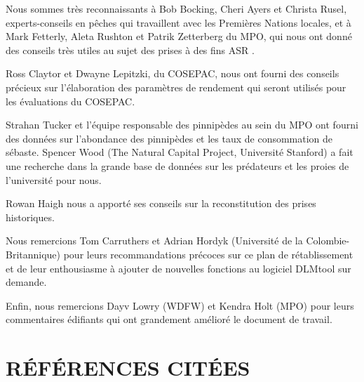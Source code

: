 \documentclass[french,11pt]{book}
\begin{document}
Nous sommes très reconnaissants à Bob Bocking, Cheri Ayers et Christa Rusel, experts-conseils en pêches qui travaillent avec les Premières Nations locales, et à Mark Fetterly, Aleta Rushton et Patrik Zetterberg du MPO, qui nous ont donné des conseils très utiles au sujet des prises à des fins ASR .

Ross Claytor et Dwayne Lepitzki, du COSEPAC, nous ont fourni des conseils précieux sur l'élaboration des paramètres de rendement qui seront utilisés pour les évaluations du COSEPAC.

Strahan Tucker et l'équipe responsable des pinnipèdes au sein du MPO ont fourni des données sur l'abondance des pinnipèdes et les taux de consommation de sébaste. Spencer Wood (The Natural Capital Project, Université Stanford) a fait une recherche dans la grande base de données sur les prédateurs et les proies de l'université pour nous.

Rowan Haigh nous a apporté ses conseils sur la reconstitution des prises historiques.

Nous remercions Tom Carruthers et Adrian Hordyk (Université de la Colombie-Britannique) pour leurs recommandations précoces sur ce plan de rétablissement et de leur enthousiasme à ajouter de nouvelles fonctions au logiciel DLMtool sur demande.

Enfin, nous remercions Dayv Lowry (WDFW) et Kendra Holt (MPO) pour leurs commentaires édifiants qui ont grandement amélioré le document de travail.

\clearpage

\hypertarget{references}{%
\section{RÉFÉRENCES CITÉES}\label{ruxe9fuxe9rences-cituxe9es}}

\noindent
\vspace{-2em}
\setlength{\parindent}{-0.2in}
\setlength{\leftskip}{0.2in}
\setlength{\parskip}{8pt}
\end{document}
